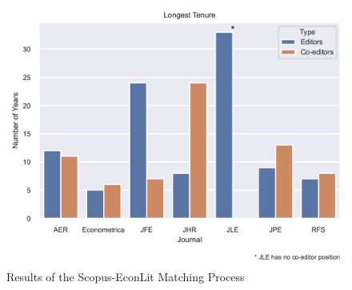 \documentclass[11pt, letterpaper, twoside]{article}
\begin{document}
\begin{figure}[h]
    \centering    
    \includegraphics[width=\textwidth]{figures/editors_max_tenure.png}
    \caption{Results of the Scopus-EconLit Matching Process}
\end{figure}
\end{document}
